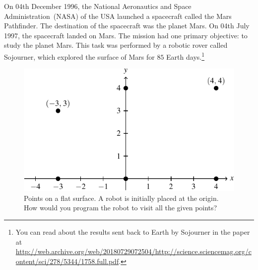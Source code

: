 \documentclass[a4paper,oneside,12pt]{article}
\begin{document}
On 04th December 1996, the National Aeronautics and Space
Administration~(NASA) of the USA launched a spacecraft called the Mars
Pathfinder.  The destination of the spacecraft was the planet Mars.
On 04th July 1997, the spacecraft landed on Mars.  The mission had one
primary objective: to study the planet Mars.  This task was performed
by a robotic rover called Sojourner, which explored the surface of
Mars for $85$ Earth days.\footnote{
  You can read about the results sent back to Earth by Sojourner in
  the paper at
  \url{http://web.archive.org/web/20180729072504/http://science.sciencemag.org/content/sci/278/5344/1758.full.pdf}.
}

\begin{figure}[!htbp]
\centering
\includegraphics[scale=1.1]{image/14/robot-path-points.pdf}
\caption{%
  Points on a flat surface.  A robot is initially placed at the
  origin.  How would you program the robot to visit all the given
  points?
}
\label{fig:conic:robot_points}
\end{figure}
\end{document}
